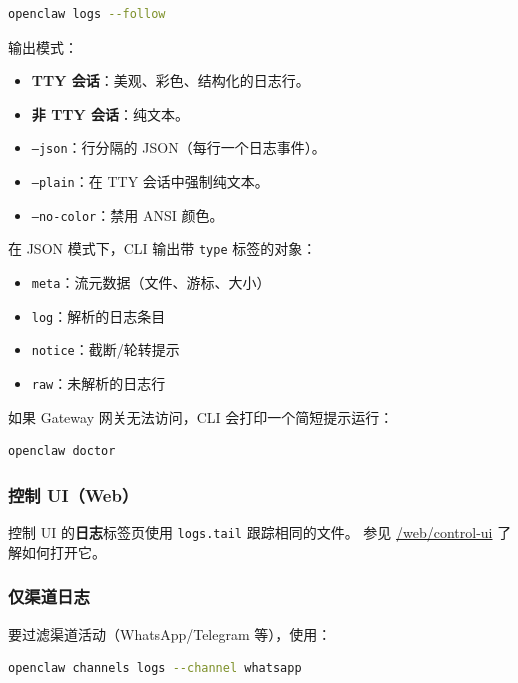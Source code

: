 \begin{lstlisting}[language=bash]
openclaw logs --follow
\end{lstlisting}


输出模式：

\begin{itemize}
  \item \textbf{TTY 会话}：美观、彩色、结构化的日志行。
  \item \textbf{非 TTY 会话}：纯文本。
  \item \texttt{--json}：行分隔的 JSON（每行一个日志事件）。
  \item \texttt{--plain}：在 TTY 会话中强制纯文本。
  \item \texttt{--no-color}：禁用 ANSI 颜色。
\end{itemize}


在 JSON 模式下，CLI 输出带 \texttt{type} 标签的对象：

\begin{itemize}
  \item \texttt{meta}：流元数据（文件、游标、大小）
  \item \texttt{log}：解析的日志条目
  \item \texttt{notice}：截断/轮转提示
  \item \texttt{raw}：未解析的日志行
\end{itemize}


如果 Gateway 网关无法访问，CLI 会打印一个简短提示运行：

\begin{lstlisting}[language=bash]
openclaw doctor
\end{lstlisting}


\subsubsection{控制 UI（Web）}


控制 UI 的\textbf{日志}标签页使用 \texttt{logs.tail} 跟踪相同的文件。
参见 \href{/web/control-ui}{/web/control-ui} 了解如何打开它。

\subsubsection{仅渠道日志}


要过滤渠道活动（WhatsApp/Telegram 等），使用：

\begin{lstlisting}[language=bash]
openclaw channels logs --channel whatsapp
\end{lstlisting}


